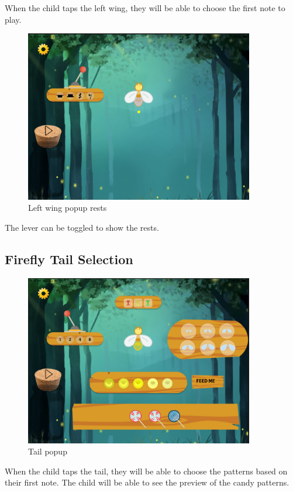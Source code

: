 When the child taps the left wing, they will be able to choose the first note to play.

\begin{figure}[H]
    \centering
    \includegraphics[width=10cm]{figures/newScreenFlows/newleftwing.png}
    \caption{Left wing popup rests}
    \label{fig:newleftwing2}
\end{figure}

The lever can be toggled to show the rests.

\subsection{Firefly Tail Selection}

\begin{figure}[H]
    \centering
    \includegraphics[width=10cm]{figures/newScreenFlows/candypreview.png}
    \caption{Tail popup}
    \label{fig:newtail}
\end{figure}

When the child taps the tail, they will be able to choose the patterns based on their first note. The child will be able to see the preview of the candy patterns.

